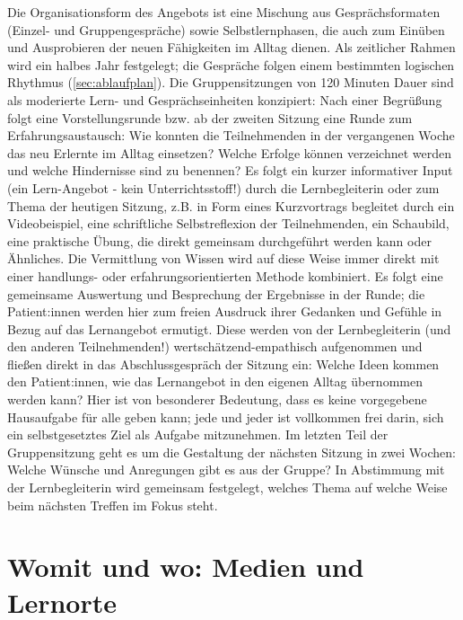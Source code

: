 \documentclass[
  twoside,
  parskip=half-,
  paper=176mm:246mm,
  BCOR=14mm,
  DIV=14,
]{scrreprt}
\begin{document}
\begin{praxis}
  Die Organisationsform des Angebots ist eine Mischung aus Gesprächsformaten (Einzel- und Gruppengespräche) sowie Selbstlernphasen, die auch zum Einüben und Ausprobieren der neuen Fähigkeiten im Alltag dienen. Als zeitlicher Rahmen wird ein halbes Jahr festgelegt; die Gespräche folgen einem bestimmten logischen Rhythmus (\autoref{sec:ablaufplan}). Die Gruppensitzungen von 120 Minuten Dauer sind als moderierte Lern- und Gesprächseinheiten konzipiert:  Nach einer Begrüßung folgt eine Vorstellungsrunde bzw. ab der zweiten Sitzung eine Runde zum Erfahrungsaustausch: Wie konnten die Teilnehmenden in der vergangenen Woche das neu Erlernte im Alltag einsetzen? Welche Erfolge können verzeichnet werden und welche Hindernisse sind zu benennen? Es folgt ein kurzer informativer Input (ein Lern-Angebot - kein Unterrichtsstoff!) durch die Lernbegleiterin oder zum Thema der heutigen Sitzung, z.B. in Form eines Kurzvortrags begleitet durch ein Videobeispiel, eine schriftliche Selbstreflexion der Teilnehmenden, ein Schaubild, eine praktische Übung, die direkt gemeinsam durchgeführt werden kann oder Ähnliches. Die Vermittlung von Wissen wird auf diese Weise immer direkt mit einer handlungs- oder erfahrungsorientierten Methode kombiniert. Es folgt eine gemeinsame Auswertung und Besprechung der Ergebnisse in der Runde; die Patient:innen werden hier zum freien Ausdruck ihrer Gedanken und Gefühle in Bezug auf das Lernangebot ermutigt. Diese werden von der Lernbegleiterin (und den anderen Teilnehmenden!) wertschätzend-empathisch aufgenommen und fließen direkt in das Abschlussgespräch der Sitzung ein: Welche Ideen kommen den Patient:innen, wie das Lernangebot in den eigenen Alltag übernommen werden kann? Hier ist von besonderer Bedeutung, dass es keine vorgegebene Hausaufgabe für alle geben kann; jede und jeder ist vollkommen frei darin, sich ein selbstgesetztes Ziel als Aufgabe mitzunehmen. Im letzten Teil der Gruppensitzung geht es um die Gestaltung der nächsten Sitzung in zwei Wochen: Welche Wünsche und Anregungen gibt es aus der Gruppe? In Abstimmung mit der Lernbegleiterin wird gemeinsam festgelegt, welches Thema auf welche Weise beim nächsten Treffen im Fokus steht.
\end{praxis}

\section{Womit und wo: Medien und Lernorte}
\end{document}

